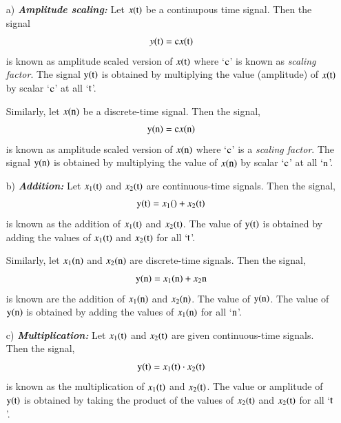 \begin{itemize}
\item[{\rm a)}]{\it \bfseries Amplitude scaling:} Let $x(\textrm{t})$ be a continupous time signal. Then the signal
\begin{equation}
y({\textrm{t}}) = {\textrm{c}}  x(\textrm{t})\label{chap1-eq-1.26}
\end{equation}
is known as amplitude scaled version of $x ({\textrm{t}})$ where `${\textrm{c}}$' is known as \textit{scaling factor}. The signal $\textrm{y} (\textrm{t})$ is obtained by multiplying the value (amplitude) of $x (\textrm{t})$  by scalar `$\textrm{c}$' at all `$\textrm{t}$'.

Similarly, let $x (\textrm{n})$ be a discrete-time signal. Then the signal,
\begin{equation}
{\textrm{y}} ({\textrm{n}}) = {\textrm{c}} x {(\textrm{n})}\label{chap1-eq-1.27}  
\end{equation}
is known as amplitude scaled version of $x (\textrm{n})$ where `$\textrm{c}$' is a \textit{scaling factor}. The signal $\textrm{y}(\textrm{n})$ is obtained by multiplying the value of $x (\textrm{n})$ by scalar `$\textrm{c}$' at all `$\textrm{n}$'.

\item [{\rm b)}] {\it \bfseries Addition:} Let $x_{1}(\textrm{t})$ and $x_{2}(\textrm{t})$ are continuous-time signals. Then the signal,
\begin{equation}
{\textrm{y}}{(\textrm{t})} = x_{1}{(\rm)} + x_{2}{(\textrm{t})}\label{chap1-eq-1.28}
\end{equation}
is known as the addition of $x_{1}{(\textrm{t})}$ and $x_{2}{(\textrm{t})}$. The value of ${\textrm{y}} {(\textrm{t})}$ is obtained by adding the values of $x_{1}{(\textrm{t})}$ and $x_{2}{(\textrm{t})}$ for all `${\textrm{t}}$'.

Similarly, let $x_{1}{(\textrm{n})}$ and $x_{2}{\rm(n)}$ are discrete-time signals. Then the signal,
\begin{equation}
{\textrm{y}}{(\textrm{n})} = x_{1} {(\textrm{n})} + x_{2}{\textrm{n}}\label{chap1-eq-1.29}
\end{equation}
is known are the addition of $x_{1}{\rm(n)}$ and $x_{2}{\rm(n)}$. The value of ${\textrm{y}}{(\textrm{n})}$. The value of ${\textrm{y}}{(\textrm{n})}$ is obtained by adding the values of $x_{1}{(\textrm{n})}$ for all `${\textrm{n}}$'.

\item[{\rm c)}]{\it \bfseries Multiplication:} Let $x_{1}{(\textrm{t})}$ and $x_{2}{(\textrm{t})}$ are given continuous-time signals. Then the signal,
\begin{equation}
{\textrm{y}}{(\textrm{t})} = x_{1}{(\textrm{t})} \cdot x_{2}{(\textrm{t})}\label{chap1-eq-1.30}
\end{equation}
is known as the multiplication of $x_{1}{(\textrm{t})}$ and $x_{2}{(\textrm{t})}$. The value or amplitude of $\textrm{y}(\textrm{t})$ is obtained by taking the product of the values of $x_{2}(\textrm{t})$ and $x_{2}(\textrm{t})$ for all `$\textrm{t}$'.


\end{itemize}

